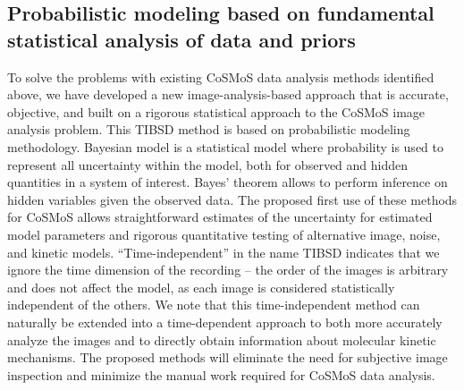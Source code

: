 \subsection{Probabilistic modeling based on fundamental statistical analysis of data and priors}

To solve the problems with existing CoSMoS data analysis methods identified above, we have developed a new image-analysis-based approach that is accurate, objective, and built on a rigorous statistical approach to the CoSMoS image analysis problem. This TIBSD method is based on probabilistic modeling methodology. Bayesian model is a statistical model where probability is used to represent all uncertainty within the model, both for observed and hidden quantities in a system of interest. Bayes' theorem allows to perform inference on hidden variables given the observed data. The proposed first use of these methods for CoSMoS allows straightforward estimates of the uncertainty for estimated model parameters and rigorous quantitative testing of alternative image, noise, and kinetic models. “Time-independent” in the name TIBSD indicates that we ignore the time dimension of the recording -- the order of the images is arbitrary and does not affect the model, as each image is considered statistically independent of the others. We note that this time-independent method can naturally be extended into a time-dependent approach to both more accurately analyze the images and to directly obtain information about molecular kinetic mechanisms.  The proposed methods will eliminate the need for subjective image inspection and minimize the manual work required for CoSMoS data analysis.